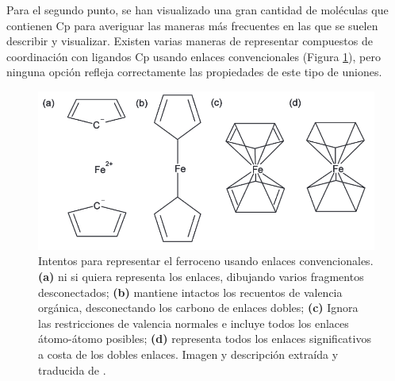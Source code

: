 Para el segundo punto, se han visualizado una gran cantidad de moléculas que contienen Cp para averiguar las maneras más frecuentes en las que se suelen describir y visualizar. Existen varias maneras de representar compuestos de coordinación con ligandos Cp usando enlaces convencionales (Figura \ref{fig:ferrocene_options}), pero ninguna opción refleja correctamente las propiedades de este tipo de uniones.
\begin{figure}[h!]
    \centering
    \includegraphics[scale=0.5]{imagenes/diseno/dibujo/varios_intentos_ferroceno.png}
    \caption{Intentos para representar el ferroceno usando enlaces convencionales. \textbf{(a)} ni si quiera representa los enlaces, dibujando varios fragmentos desconectados; \textbf{(b)} mantiene intactos los recuentos de valencia orgánica, desconectando los carbono de enlaces dobles; \textbf{(c)} Ignora las restricciones de valencia normales e incluye todos los enlaces átomo-átomo posibles; \textbf{(d)} representa todos los enlaces significativos a costa de los dobles enlaces. Imagen y descripción extraída y traducida de \cite{zero_order}.}
    \label{fig:ferrocene_options}
\end{figure}

